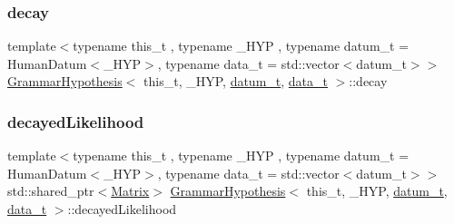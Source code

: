 \mbox{\label{class_grammar_hypothesis_a1ff45b8e4d4e7ace3dcddb6dab5c5c58}} 
\subsubsection{\texorpdfstring{decay}{decay}}
{\footnotesize\ttfamily template$<$typename this\+\_\+t , typename \+\_\+\+H\+YP , typename datum\+\_\+t  = Human\+Datum$<$\+\_\+\+H\+Y\+P$>$, typename data\+\_\+t  = std\+::vector$<$datum\+\_\+t$>$$>$ \\
\hyperlink{class_grammar_hypothesis}{Grammar\+Hypothesis}$<$ this\+\_\+t, \+\_\+\+H\+YP, \hyperlink{class_bayesable_a9f1a6c0cd7855550fa10b1a8f13a5867}{datum\+\_\+t}, \hyperlink{class_bayesable_aa2788c4d7718c0a824e1d28c4c98f921}{data\+\_\+t} $>$\+::decay}

\mbox{\label{class_grammar_hypothesis_a9e543dfed61a4196c98135409d4b264c}} 
\subsubsection{\texorpdfstring{decayed\+Likelihood}{decayedLikelihood}}
{\footnotesize\ttfamily template$<$typename this\+\_\+t , typename \+\_\+\+H\+YP , typename datum\+\_\+t  = Human\+Datum$<$\+\_\+\+H\+Y\+P$>$, typename data\+\_\+t  = std\+::vector$<$datum\+\_\+t$>$$>$ \\
std\+::shared\+\_\+ptr$<$\hyperlink{_eigen_lib_8h_a645222978e81acfb2523a9bce34aecc0}{Matrix}$>$ \hyperlink{class_grammar_hypothesis}{Grammar\+Hypothesis}$<$ this\+\_\+t, \+\_\+\+H\+YP, \hyperlink{class_bayesable_a9f1a6c0cd7855550fa10b1a8f13a5867}{datum\+\_\+t}, \hyperlink{class_bayesable_aa2788c4d7718c0a824e1d28c4c98f921}{data\+\_\+t} $>$\+::decayed\+Likelihood}

\mbox{\label{class_grammar_hypothesis_aff7618f98de8737df436c86424cc62ed}} 
